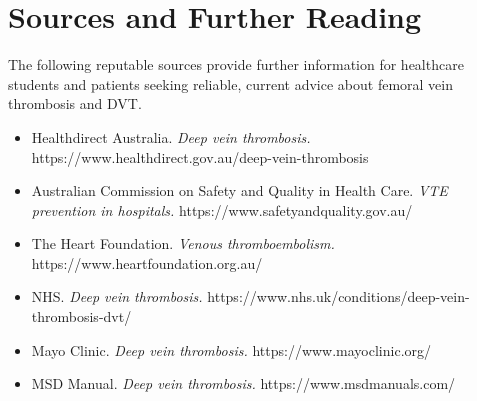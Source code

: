 \section*{Sources and Further Reading}
The following reputable sources provide further information for healthcare students and patients seeking reliable, current advice about femoral vein thrombosis and DVT.
\begin{itemize}
    \item Healthdirect Australia. \textit{Deep vein thrombosis.} https://www.healthdirect.gov.au/deep-vein-thrombosis
    \item Australian Commission on Safety and Quality in Health Care. \textit{VTE prevention in hospitals.} https://www.safetyandquality.gov.au/
    \item The Heart Foundation. \textit{Venous thromboembolism.} https://www.heartfoundation.org.au/
    \item NHS. \textit{Deep vein thrombosis.} https://www.nhs.uk/conditions/deep-vein-thrombosis-dvt/
    \item Mayo Clinic. \textit{Deep vein thrombosis.} https://www.mayoclinic.org/
    \item MSD Manual. \textit{Deep vein thrombosis.} https://www.msdmanuals.com/
\end{itemize}
